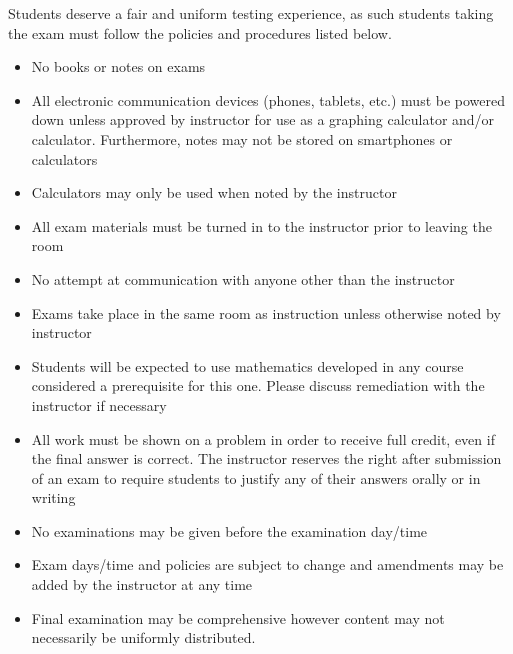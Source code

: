  


Students deserve a fair and uniform testing experience, as such  students taking the exam must follow the policies and procedures listed below.

\begin{itemize}
\item No books or notes on exams
\item  All electronic communication devices (phones, tablets, etc.) must be powered down unless approved by instructor for use as a graphing calculator and/or calculator.  Furthermore, notes may not be stored on smartphones or calculators

\item Calculators may only be used when noted by the instructor


\item  All exam materials must be turned in to the instructor prior to leaving the room

\item  No attempt at communication with anyone other than the instructor

\item  Exams take place in the same room as instruction unless otherwise noted by instructor


\item  Students will be expected to use mathematics developed in any course considered a prerequisite for this one. Please discuss remediation with the instructor if necessary


\item  All work must be shown on a problem in order to receive full credit, even if the final answer is correct. The instructor reserves the right after submission of an exam to require students to justify any of their answers orally or in writing

\item No examinations may be given before the examination day/time

\item Exam days/time and policies are subject to change and amendments may be added by the instructor at any time

\item Final examination may be comprehensive however content may not necessarily be uniformly distributed. 
\end{itemize}



